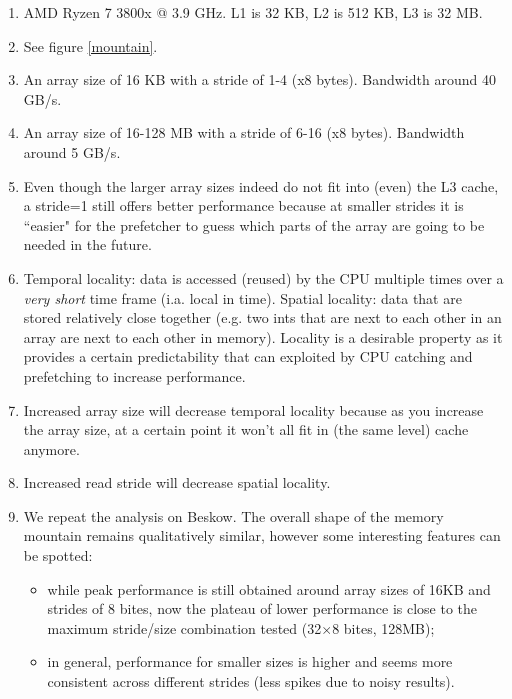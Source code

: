 \documentclass[a4paper]{article}
\begin{document}
\begin{enumerate}
    \setlength\itemsep{0.01em}
    \item AMD Ryzen 7 3800x @ 3.9 GHz. L1 is 32 KB, L2 is 512 KB, L3 is 32 MB.
    \item See figure \ref{mountain}.
    \item An array size of 16 KB with a stride of 1-4 (x8 bytes). Bandwidth around 40 GB/s.
    \item An array size of 16-128 MB with a stride of 6-16 (x8 bytes). Bandwidth around 5 GB/s.
    \item Even though the larger array sizes indeed do not fit into (even) the L3 cache, a stride=1 still offers better performance because at smaller strides it is ``easier" for the prefetcher to guess which parts of the array are going to be needed in the future.
    \item Temporal locality: data is accessed (reused) by the CPU multiple times over a \textit{very short} time frame (i.a. local in time). Spatial locality: data that are stored relatively close together (e.g. two ints that are next to each other in an array are next to each other in memory). Locality is a desirable property as it provides a certain predictability that can exploited by CPU catching and prefetching to increase performance.
    \item Increased array size will decrease temporal locality because as you increase the array size, at a certain point it won't all fit in (the same level) cache anymore.
    \item Increased read stride will decrease spatial locality.
    \item We repeat the analysis on Beskow. The overall shape of the memory mountain remains qualitatively similar, however some interesting features can be spotted:
    \begin{itemize}
        \item while peak performance is still obtained around array sizes of 16KB and strides of 8 bites, now the plateau of lower performance is close to the maximum stride/size combination tested (32$\times$8 bites, 128MB);
        \item in general, performance for smaller sizes is higher and seems more consistent across different strides (less spikes due to noisy results).
    \end{itemize}
\end{enumerate}
\end{document}
